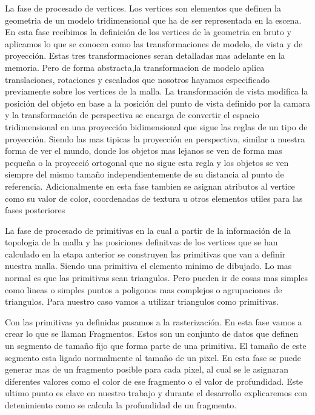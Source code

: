 \begin{list}{.}{}
    \item La fase de procesado de vertices. Los vertices son elementos que definen la geometria de un modelo tridimensional que ha de ser representada en la escena.
    En esta fase recibimos la definición de los vertices de la geometria en bruto y aplicamos lo que se conocen como las transformaciones de modelo, de vista y de proyección.
    Estas tres transformaciones seran detalladas mas adelante en la memoria. Pero de forma abstracta,la transformacion de modelo aplica translaciones, rotaciones y escalados que nosotros
    hayamos especificado previamente sobre los vertices de la malla. La transformación de vista modifica la posición del objeto en base a la posición del punto de vista definido por la camara
    y la transformación de perspectiva se encarga de convertir el espacio tridimensional en una proyección bidimensional que sigue las reglas de un tipo de proyección. Siendo las mas tipicas la proyección
    en perspectiva, similar a nuestra forma de ver el mundo, donde los objetos mas lejanos se ven de forma mas pequeña o la proyecció ortogonal que no sigue esta regla y los objetos se ven siempre del mismo tamaño independientemente
    de su distancia al punto de referencia. \cite{codinglabsCodingLabs} Adicionalmente en esta fase tambien se asignan atributos al vertice como su valor de color, coordenadas de textura u otros elementos utiles para las fases posteriores \cite{freeSI03graphicsPipeline}
    \item La fase de procesado de primitivas en la cual a partir de la información de la topologia de la malla y las posiciones definitvas de los vertices que se han calculado en la etapa anterior se construyen las primitivas que van a definir nuestra malla. Siendo una primitiva
    el elemento minimo de dibujado. Lo mas normal es que las primitivas sean triangulos. Pero pueden ir de cosas mas simples como lineas o simples puntos a poligonos mas complejos o agrupaciones de triangulos. Para nuestro caso vamos a utilizar triangulos como primitivas. \cite{freeSI03graphicsPipeline}
    \item Con las primitivas ya definidas pasamos a la rasterización. En esta fase vamos a crear lo que se llaman Fragmentos. Estos son un conjunto de datos que definen un segmento de tamaño fijo que forma parte de una primitiva. El tamaño de este segmento esta ligado normalmente al tamaño de un pixel. En esta fase se puede generar mas de un fragmento posible para cada pixel,
     al cual se le asignaran diferentes valores como el color de ese fragmento o el valor de profundidad\cite{khronosFragmentOpenGL}. Este ultimo punto es clave en nuestro trabajo y durante el desarrollo explicaremos con detenimiento como se calcula la profundidad de un fragmento.

\end{list}
